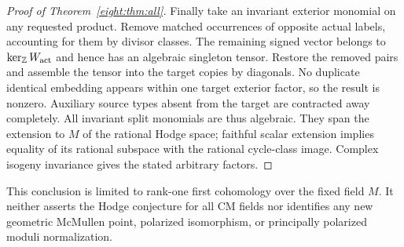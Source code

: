 \begin{proof}[Proof of Theorem~\ref{eight:thm:all}]
Finally take an invariant exterior monomial on any requested product.
Remove matched occurrences of opposite actual labels, accounting for
them by divisor classes. The remaining signed vector belongs to
$\ker_{\mathbb Z}W_{\rm act}$ and hence has an algebraic singleton tensor.
Restore the removed pairs and assemble the tensor into the target
copies by diagonals. No duplicate identical embedding appears within
one target exterior factor, so the result is nonzero. Auxiliary source
types absent from the target are contracted away completely.
All invariant split monomials are thus algebraic. They span the
extension to $M$ of the rational Hodge space; faithful scalar extension
implies equality of its rational subspace with the rational cycle-class
image. Complex isogeny invariance gives the stated arbitrary factors.
\end{proof}

This conclusion is limited to rank-one first cohomology over the fixed
field $M$. It neither asserts the Hodge conjecture for all CM fields
nor identifies any new geometric McMullen point, polarized isomorphism,
or principally polarized moduli normalization.

